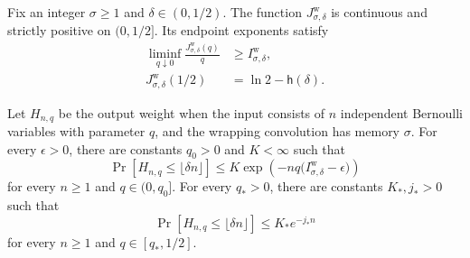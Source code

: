 \begin{lemma}
\label{lem:wrapped-ec-endpoint-exponents}
Fix an integer $\sigma\geq1$ and $\delta\in(0,1/2)$.  The function
$J^{\mathrm{w}}_{\sigma,\delta}$ is continuous and strictly positive on
$(0,1/2]$.  Its endpoint exponents satisfy
\begin{align}
 \liminf_{q\downarrow0}
 \frac{J^{\mathrm{w}}_{\sigma,\delta}(q)}{q}
 &\geq I^{\mathrm{w}}_{\sigma,\delta},
 \label{eq:wrapped-ec-sparse-exponent-limit}\\
 J^{\mathrm{w}}_{\sigma,\delta}(1/2)
 &=\ln2-\mathsf{h}(\delta).
 \label{eq:wrapped-ec-dense-exponent}
\end{align}

Let $H_{n,q}$ be the output weight when the input consists of $n$ independent
Bernoulli variables with parameter $q$, and the wrapping convolution has
memory $\sigma$.  For every $\epsilon>0$, there are constants $q_0>0$ and
$K<\infty$ such that
\begin{equation}
 \Pr[H_{n,q}\leq\lfloor\delta n\rfloor]
 \leq K\exp\left(
  -nq\bigl(I^{\mathrm{w}}_{\sigma,\delta}-\epsilon\bigr)
 \right)
 \label{eq:wrapped-ec-uniform-sparse-tail}
\end{equation}
for every $n\geq1$ and $q\in(0,q_0]$.  For every $q_*>0$, there are constants
$K_*,j_*>0$ such that
\begin{equation}
 \Pr[H_{n,q}\leq\lfloor\delta n\rfloor]
 \leq K_*e^{-j_*n}
 \label{eq:wrapped-ec-uniform-intermediate-tail}
\end{equation}
for every $n\geq1$ and $q\in[q_*,1/2]$.
\end{lemma}

